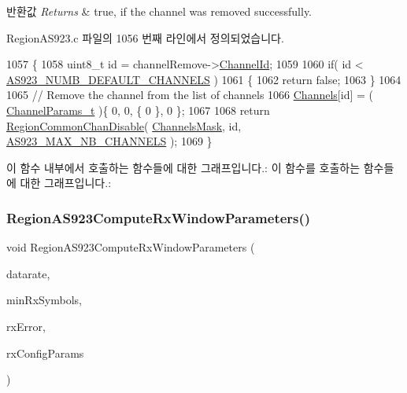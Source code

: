 \begin{DoxyRetVals}{반환값}
{\em Returns} & true, if the channel was removed successfully. \\
\hline
\end{DoxyRetVals}


Region\+A\+S923.\+c 파일의 1056 번째 라인에서 정의되었습니다.


\begin{DoxyCode}
1057 \{
1058     uint8\_t \textcolor{keywordtype}{id} = channelRemove->\mbox{\hyperlink{structs_channel_remove_params_ae23f953dc29c360e56a3c856404a3276}{ChannelId}};
1059 
1060     \textcolor{keywordflow}{if}( \textcolor{keywordtype}{id} < \mbox{\hyperlink{group___r_e_g_i_o_n_a_s923_ga189fa7f36943ed53424ac7610ef64d56}{AS923\_NUMB\_DEFAULT\_CHANNELS}} )
1061     \{
1062         \textcolor{keywordflow}{return} \textcolor{keyword}{false};
1063     \}
1064 
1065     \textcolor{comment}{// Remove the channel from the list of channels}
1066     \mbox{\hyperlink{_region_a_s923_8c_a02bae2504563543865d6b0e81c48ab61}{Channels}}[id] = ( \mbox{\hyperlink{group___l_o_r_a_m_a_c_ga1360ca6f82c6d125ea43a9dad9b56184}{ChannelParams\_t}} )\{ 0, 0, \{ 0 \}, 0 \};
1067 
1068     \textcolor{keywordflow}{return} \mbox{\hyperlink{group___r_e_g_i_o_n_c_o_m_m_o_n_ga695c0ab2a06edcae5b33772f639fb676}{RegionCommonChanDisable}}( \mbox{\hyperlink{_region_a_s923_8c_a2188957b5ca6af8092154d7ccbfa5757}{ChannelsMask}}, \textcolor{keywordtype}{id}, 
      \mbox{\hyperlink{group___r_e_g_i_o_n_a_s923_ga02e3db7e4557dbf77db79285d38dc33e}{AS923\_MAX\_NB\_CHANNELS}} );
1069 \}
\end{DoxyCode}
이 함수 내부에서 호출하는 함수들에 대한 그래프입니다.\+:
이 함수를 호출하는 함수들에 대한 그래프입니다.\+:
\mbox{\label{group___r_e_g_i_o_n_a_s923_ga33875aeda67698b7be396f9ef9b1d081}} 
\subsubsection{\texorpdfstring{Region\+A\+S923\+Compute\+Rx\+Window\+Parameters()}{RegionAS923ComputeRxWindowParameters()}}
{\footnotesize\ttfamily void Region\+A\+S923\+Compute\+Rx\+Window\+Parameters (\begin{DoxyParamCaption}\item[{int8\+\_\+t}]{datarate,  }\item[{uint8\+\_\+t}]{min\+Rx\+Symbols,  }\item[{uint32\+\_\+t}]{rx\+Error,  }\item[{\mbox{\hyperlink{group___r_e_g_i_o_n_ga375c038078dfcfc7ef14280021db719e}{Rx\+Config\+Params\+\_\+t}} $\ast$}]{rx\+Config\+Params }\end{DoxyParamCaption})}

